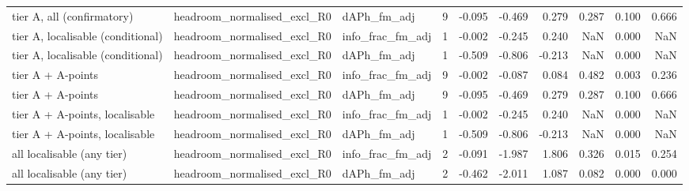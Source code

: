 \begin{tabular}{lllrrrrrrr}
tier A, all (confirmatory) & headroom\_normalised\_excl\_R0 & dAPh\_fm\_adj & 9 & -0.095 & -0.469 & 0.279 & 0.287 & 0.100 & 0.666 \\
tier A, localisable (conditional) & headroom\_normalised\_excl\_R0 & info\_frac\_fm\_adj & 1 & -0.002 & -0.245 & 0.240 & NaN & 0.000 & NaN \\
tier A, localisable (conditional) & headroom\_normalised\_excl\_R0 & dAPh\_fm\_adj & 1 & -0.509 & -0.806 & -0.213 & NaN & 0.000 & NaN \\
tier A + A-points & headroom\_normalised\_excl\_R0 & info\_frac\_fm\_adj & 9 & -0.002 & -0.087 & 0.084 & 0.482 & 0.003 & 0.236 \\
tier A + A-points & headroom\_normalised\_excl\_R0 & dAPh\_fm\_adj & 9 & -0.095 & -0.469 & 0.279 & 0.287 & 0.100 & 0.666 \\
tier A + A-points, localisable & headroom\_normalised\_excl\_R0 & info\_frac\_fm\_adj & 1 & -0.002 & -0.245 & 0.240 & NaN & 0.000 & NaN \\
tier A + A-points, localisable & headroom\_normalised\_excl\_R0 & dAPh\_fm\_adj & 1 & -0.509 & -0.806 & -0.213 & NaN & 0.000 & NaN \\
all localisable (any tier) & headroom\_normalised\_excl\_R0 & info\_frac\_fm\_adj & 2 & -0.091 & -1.987 & 1.806 & 0.326 & 0.015 & 0.254 \\
all localisable (any tier) & headroom\_normalised\_excl\_R0 & dAPh\_fm\_adj & 2 & -0.462 & -2.011 & 1.087 & 0.082 & 0.000 & 0.000 \\
\bottomrule
\end{tabular}
